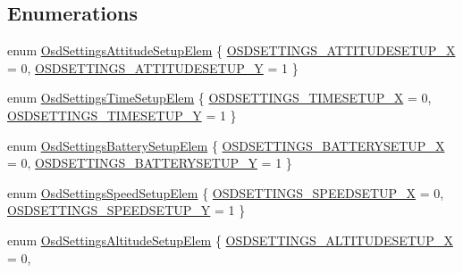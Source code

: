 \subsection*{\-Enumerations}
\begin{DoxyCompactItemize}
\item 
enum \hyperlink{group___osd_settings_gaafe2302d46b0c673994c2256b3024127}{\-Osd\-Settings\-Attitude\-Setup\-Elem} \{ \hyperlink{group___osd_settings_ggaafe2302d46b0c673994c2256b3024127a9d74da6dece789d168dd03fb4481f010}{\-O\-S\-D\-S\-E\-T\-T\-I\-N\-G\-S\-\_\-\-A\-T\-T\-I\-T\-U\-D\-E\-S\-E\-T\-U\-P\-\_\-\-X} = 0, 
\hyperlink{group___osd_settings_ggaafe2302d46b0c673994c2256b3024127a732a83ed7c0b5b9dce704a19f392313a}{\-O\-S\-D\-S\-E\-T\-T\-I\-N\-G\-S\-\_\-\-A\-T\-T\-I\-T\-U\-D\-E\-S\-E\-T\-U\-P\-\_\-\-Y} = 1
 \}
\item 
enum \hyperlink{group___osd_settings_ga9c6b6b667b67fb2d2ea3157896adc301}{\-Osd\-Settings\-Time\-Setup\-Elem} \{ \hyperlink{group___osd_settings_gga9c6b6b667b67fb2d2ea3157896adc301a7e7bd8025cbb8f5bd80505d264484c74}{\-O\-S\-D\-S\-E\-T\-T\-I\-N\-G\-S\-\_\-\-T\-I\-M\-E\-S\-E\-T\-U\-P\-\_\-\-X} = 0, 
\hyperlink{group___osd_settings_gga9c6b6b667b67fb2d2ea3157896adc301a885516495bd0eb93856c4144f463dd7c}{\-O\-S\-D\-S\-E\-T\-T\-I\-N\-G\-S\-\_\-\-T\-I\-M\-E\-S\-E\-T\-U\-P\-\_\-\-Y} = 1
 \}
\item 
enum \hyperlink{group___osd_settings_ga590f340219792c408464bf2da81827d0}{\-Osd\-Settings\-Battery\-Setup\-Elem} \{ \hyperlink{group___osd_settings_gga590f340219792c408464bf2da81827d0a4691ca9447ec18ff861783021f9cc64e}{\-O\-S\-D\-S\-E\-T\-T\-I\-N\-G\-S\-\_\-\-B\-A\-T\-T\-E\-R\-Y\-S\-E\-T\-U\-P\-\_\-\-X} = 0, 
\hyperlink{group___osd_settings_gga590f340219792c408464bf2da81827d0af37c05b66a4e7c9517d68ffbd07fb359}{\-O\-S\-D\-S\-E\-T\-T\-I\-N\-G\-S\-\_\-\-B\-A\-T\-T\-E\-R\-Y\-S\-E\-T\-U\-P\-\_\-\-Y} = 1
 \}
\item 
enum \hyperlink{group___osd_settings_ga51a790a0000d545e412888d1b7fa3ad2}{\-Osd\-Settings\-Speed\-Setup\-Elem} \{ \hyperlink{group___osd_settings_gga51a790a0000d545e412888d1b7fa3ad2a2c0f6c038fb2a233e97dc26b1921aa4b}{\-O\-S\-D\-S\-E\-T\-T\-I\-N\-G\-S\-\_\-\-S\-P\-E\-E\-D\-S\-E\-T\-U\-P\-\_\-\-X} = 0, 
\hyperlink{group___osd_settings_gga51a790a0000d545e412888d1b7fa3ad2acb49400c717ad099d43ea35b33976c46}{\-O\-S\-D\-S\-E\-T\-T\-I\-N\-G\-S\-\_\-\-S\-P\-E\-E\-D\-S\-E\-T\-U\-P\-\_\-\-Y} = 1
 \}
\item 
enum \hyperlink{group___osd_settings_ga18264390d2835507563456b24f1dcb60}{\-Osd\-Settings\-Altitude\-Setup\-Elem} \{ \hyperlink{group___osd_settings_gga18264390d2835507563456b24f1dcb60a92fad892ebfdd28039568a95351919e8}{\-O\-S\-D\-S\-E\-T\-T\-I\-N\-G\-S\-\_\-\-A\-L\-T\-I\-T\-U\-D\-E\-S\-E\-T\-U\-P\-\_\-\-X} = 0, 

\end{DoxyCompactItemize}
